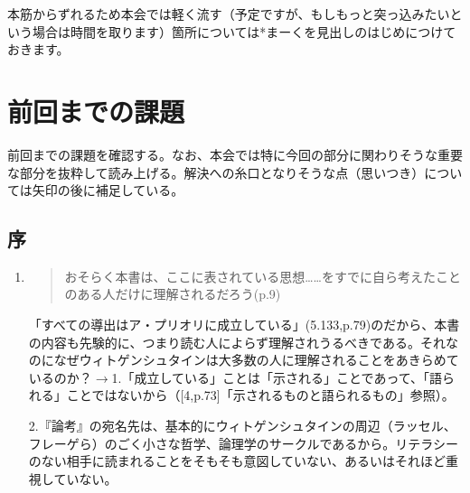 \documentclass[11pt,a4paper]{jsarticle}
\begin{document}
本筋からずれるため本会では軽く流す（予定ですが、もしもっと突っ込みたいという場合は時間を取ります）箇所については*まーくを見出しのはじめにつけておきます。

\section{前回までの課題} \label{zenkadai}

前回までの課題を確認する。なお、本会では特に今回の部分に関わりそうな重要な部分を抜粋して読み上げる。解決への糸口となりそうな点（思いつき）については矢印の後に補足している。

\subsection{序}
\begin{enumerate}
\item
\begin{quote}おそらく本書は、ここに表されている思想……をすでに自ら考えたことのある人だけに理解されるだろう(p.9)
\end{quote}
「すべての導出はア・プリオリに成立している」(5.133,p.79)のだから、本書の内容も先験的に、つまり読む人によらず理解されうるべきである。それなのになぜウィトゲンシュタインは大多数の人に理解されることをあきらめているのか？$\rightarrow$1.「成立している」ことは「示される」ことであって、「語られる」ことではないから（[4,p.73]「示されるものと語られるもの」参照）。

2.『論考』の宛名先は、基本的にウィトゲンシュタインの周辺（ラッセル、フレーゲら）のごく小さな哲学、論理学のサークルであるから。リテラシーのない相手に読まれることをそもそも意図していない、あるいはそれほど重視していない。
\end{enumerate}
\end{document}
